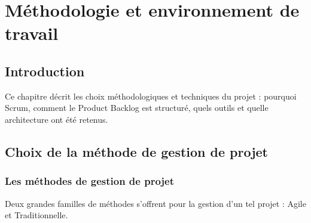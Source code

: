 \chapter{Méthodologie et environnement de travail}

\section*{Introduction}
Ce chapitre décrit les choix méthodologiques et techniques du projet : pourquoi Scrum, comment le Product Backlog est structuré, quels outils et quelle architecture ont été retenus.

\section{Choix de la méthode de gestion de projet}

\subsection{Les méthodes de gestion de projet}
Deux grandes familles de méthodes s'offrent pour la gestion d'un tel projet : Agile et Traditionnelle.

